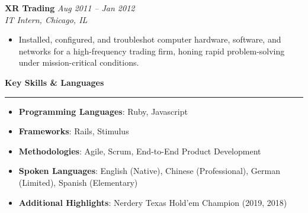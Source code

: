 \documentclass[letterpaper,10pt]{article}
\newcommand{\resheading}[1]{
  \vspace{10pt}
  \textbf{\large #1}
  \vspace{5pt}
  \hrule
  \vspace{5pt}
}
\begin{document}
\textbf{XR Trading} \hfill \textit{Aug 2011 -- Jan 2012}\\
\emph{IT Intern, Chicago, IL}\\
\begin{itemize}
  \item Installed, configured, and troubleshot computer hardware, software, and 
        networks for a high-frequency trading firm, honing rapid problem-solving 
        under mission-critical conditions.
\end{itemize}

\resheading{Key Skills \& Languages}
\begin{itemize}
  \item \textbf{Programming Languages}: Ruby, Javascript
  \item \textbf{Frameworks}: Rails, Stimulus
  \item \textbf{Methodologies}: Agile, Scrum, End-to-End Product Development
  \item \textbf{Spoken Languages}: English (Native), Chinese (Professional), German (Limited), Spanish (Elementary)
  \item \textbf{Additional Highlights}: Nerdery Texas Hold'em Champion (2019, 2018)
\end{itemize}

\end{document}
